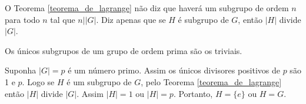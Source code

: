 \begin{observacao}
	O Teorema \ref{teorema_de_lagrange} n{\~a}o diz que haver{\'a} um subgrupo de ordem $n$ para todo $n$ tal que $n||G|$. Diz apenas que se $H$ {\'e} subgrupo de $G$, ent{\~a}o $|H|$ divide $|G|$.
\end{observacao}

\begin{corolario}
	Os {\'u}nicos subgrupos de um grupo de ordem prima s{\~a}o os triviais.
\end{corolario}
\begin{prova}
	Suponha $|G| = p$ \'e um n\'umero primo. Assim os {\'u}nicos divisores positivos de $p$ s{\~a}o 1 e $p$. Logo se $H$ {\'e} um subgrupo de $G$, pelo Teorema \ref{teorema_de_lagrange} ent{\~a}o $|H|$ divide $|G|$. Assim $|H| = 1$ ou $|H| = p$. Portanto, $H=\{e\}$ ou $H = G$.
\end{prova}





